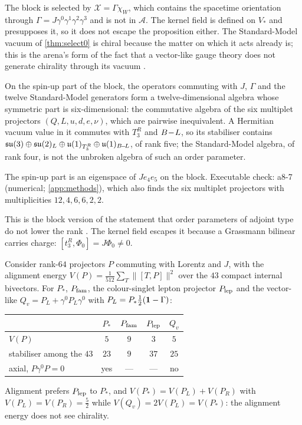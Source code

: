 The block is selected by $\mathcal X=\Gamma\chi_W$, which contains the spacetime orientation through $\Gamma=J\gamma^0\gamma^1\gamma^2\gamma^3$ and is not in $\mathcal A$. The kernel field
is defined on $V_*$ and presupposes it, so it does not escape the proposition either. The Standard-Model vacuum of \cref{thm:select0} is chiral because the
matter on which it acts already is; this is the arena's form of the fact that a vector-like gauge theory does not generate chirality through its vacuum
\cite{VafaWitten84b}.

\begin{proposition}
\label{prop:rankfive}
On the spin-up part of the block, the operators commuting with $J$, $\Gamma$ and the twelve Standard-Model generators form a twelve-dimensional algebra whose
symmetric part is six-dimensional: the commutative algebra of the six multiplet projectors $(Q,L,u,d,e,\nu)$, which are pairwise inequivalent. A Hermitian vacuum
value in it commutes with $T^R_3$ and $B\!-\!L$, so its stabiliser contains $\mathfrak{su}(3)\oplus\mathfrak{su}(2)_L\oplus\mathfrak{u}(1)_{T^R_3}\oplus\mathfrak{u}(1)_{B\!-\!L}$, of rank five; the Standard-Model algebra, of
rank four, is not the unbroken algebra of such an order parameter.
\end{proposition}

\noindent The spin-up part is an eigenspace of $Je_4e_5$ on the block. Executable check: a8-7 (numerical; \cref{app:methods}), which also finds the six
multiplet projectors with multiplicities $12,4,6,6,2,2$.

This is the block version of the statement that order parameters of adjoint type do not lower the rank \cite{Li74}. The kernel field escapes it because a
Grassmann bilinear carries charge: $[t^R_3,\Phi_0]=J\Phi_0\neq0$.

\begin{proposition}
\label{prop:alignment}
Consider rank-$64$ projectors $P$ commuting with Lorentz and $J$, with the alignment energy $V(P)=\tfrac1{512}\sum_T\|[T,P]\|^2$ over the $43$ compact internal
bivectors. For $P_*$, $P_{\rm fam}$, the colour-singlet lepton projector $P_{\rm lep}$ and the vector-like $Q_v=P_L+\gamma^0P_L\gamma^0$ with $P_L=P_*\tfrac12(\mathbf 1-\Gamma)$:
\begin{center}
\small
\begin{tabular}{@{}lcccc@{}}
\toprule
 & $P_*$ & $P_{\rm fam}$ & $P_{\rm lep}$ & $Q_v$\\
\midrule
$V(P)$ & $5$ & $9$ & $3$ & $5$\\
stabiliser among the $43$ & $23$ & $9$ & $37$ & $25$\\
axial, $P\gamma^0P=0$ & yes & --- & --- & no\\
\bottomrule
\end{tabular}
\end{center}
Alignment prefers $P_{\rm lep}$ to $P_*$, and $V(P_*)=V(P_L)+V(P_R)$ with $V(P_L)=V(P_R)=\tfrac52$ while $V(Q_v)=2V(P_L)=V(P_*)$: the alignment energy does not see
chirality.
\end{proposition}

